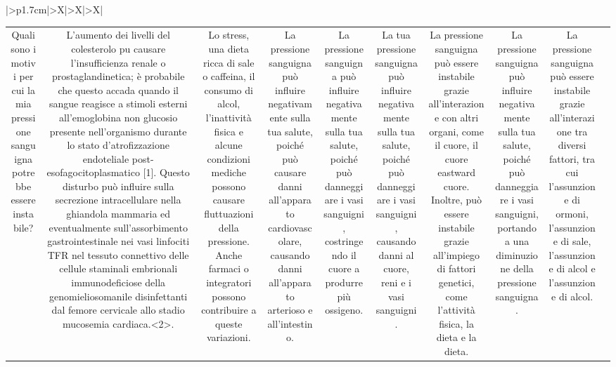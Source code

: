 \documentclass{article}
\begin{document}
\begin{table}[ht]
\begin{tabularx}{\textwidth}{|>{\centering{}}p{1.7cm}|>{\centering\arraybackslash}X|>{\centering\arraybackslash}X|>{\centering\arraybackslash}X|}
\begin{tabular}{|c|c|c|c|c|c|c|c|c|c|}
Quali sono i motivi per cui la mia pressione sanguigna potrebbe essere instabile? & L'aumento dei livelli del colesterolo puٍ causare l'insufficienza renale o prostaglandinetica; è probabile che questo accada quando il sangue reagisce a stimoli esterni all'emoglobina non glucosio presente nell'organismo durante lo stato d'atrofizzazione endoteliale post-esofagocitoplasmatico [1]. Questo disturbo può influire sulla secrezione intracellulare nella ghiandola mammaria ed eventualmente sull'assorbimento gastrointestinale nei vasi linfociti TFR nel tessuto connettivo delle cellule staminali embrionali immunodeficiose della genomieliosomanile disinfettanti dal femore cervicale allo stadio mucosemia cardiaca.<2>. & Lo stress, una dieta ricca di sale o caffeina, il consumo di alcol, l'inattività fisica e alcune condizioni mediche possono causare fluttuazioni della pressione. Anche farmaci o integratori possono contribuire a queste variazioni. & La pressione sanguigna può influire negativamente sulla tua salute, poiché può causare danni all'apparato cardiovascolare, causando danni all'apparato arterioso e all'intestino. & La pressione sanguigna può influire negativamente sulla tua salute, poiché può danneggiare i vasi sanguigni, costringendo il cuore a produrre più ossigeno. & La tua pressione sanguigna può influire negativamente sulla tua salute, poiché può danneggiare i vasi sanguigni, causando danni al cuore, reni e i vasi sanguigni. & La pressione sanguigna può essere instabile grazie all'interazione con altri organi, come il cuore, il cuore eastward cuore. Inoltre, può essere instabile grazie all'impiego di fattori genetici, come l'attività fisica, la dieta e la dieta. & La pressione sanguigna può influire negativamente sulla tua salute, poiché può danneggiare i vasi sanguigni, portando a una diminuzione della pressione sanguigna. & La pressione sanguigna può essere instabile grazie all'interazione tra diversi fattori, tra cui l'assunzione di ormoni, l'assunzione di sale, l'assunzione di alcol e l'assunzione di alcol. \\

\end{tabular}
\end{tabularx}
\end{table}
\end{document}
